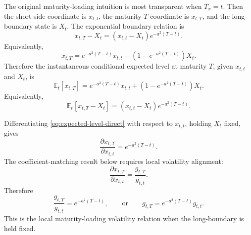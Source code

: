 \documentclass[11pt]{article}
\numberwithin{equation}{section}
\begin{document}
The original maturity-loading intuition is most transparent when \(T_x=t\). Then the short-side coordinate is \(x_{t,t}\), the maturity-\(T\) coordinate is \(x_{t,T}\), and the long-boundary state is \(X_t\). The exponential boundary relation is
\begin{equation}
\label{eq:expected-level-boundary-relation}
x_{t,T}-X_t
=
\left(x_{t,t}-X_t\right)e^{-a^2(T-t)}.
\end{equation}
Equivalently,
\begin{equation}
\label{eq:expected-level-direct}
x_{t,T}
=
e^{-a^2(T-t)}x_{t,t}
+
\left(1-e^{-a^2(T-t)}\right)X_t.
\end{equation}
Therefore the instantaneous conditional expected level at maturity \(T\), given \(x_{t,t}\) and \(X_t\), is
\begin{equation}
\label{eq:instantaneous-expected-level}
\mathbb E_t[x_{t,T}]
=
e^{-a^2(T-t)}x_{t,t}
+
\left(1-e^{-a^2(T-t)}\right)X_t.
\end{equation}
Equivalently,
\[
\mathbb E_t[x_{t,T}-X_t]
=
\left(x_{t,t}-X_t\right)e^{-a^2(T-t)}.
\]

Differentiating \eqref{eq:expected-level-direct} with respect to \(x_{t,t}\), holding \(X_t\) fixed, gives
\begin{equation}
\label{eq:local-maturity-loading-derivative}
\frac{\partial x_{t,T}}{\partial x_{t,t}}
=
e^{-a^2(T-t)}.
\end{equation}
The coefficient-matching result below requires local volatility alignment:
\[
\frac{\partial x_{t,T}}{\partial x_{t,t}}
=
\frac{g_{t,T}}{g_{t,t}}.
\]
Therefore
\begin{equation}
\label{eq:maturity-vol-alignment}
\frac{g_{t,T}}{g_{t,t}}
=
e^{-a^2(T-t)},
\qquad
\text{or}
\qquad
g_{t,T}=e^{-a^2(T-t)}g_{t,t}.
\end{equation}
This is the local maturity-loading volatility relation when the long-boundary is held fixed.
\end{document}
